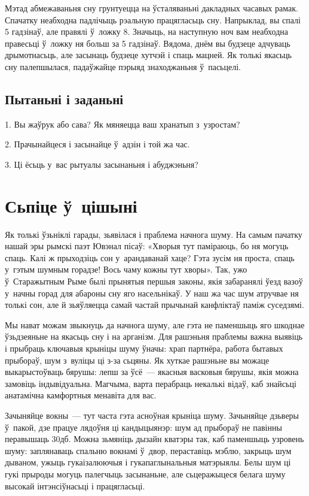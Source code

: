 Мэтад абмежаваньня сну грунтуецца на ўсталяваньні дакладных часавых рамак. Спачатку неабходна падлічыць рэальную працягласьць сну. Напрыклад, вы спалі 5 гадзінаў, але правялі ў~ложку 8. Значыць, на наступную ноч вам неабходна правесьці ў~ложку ня больш за 5 гадзінаў. Вядома, днём вы будзеце адчуваць дрымотнасьць, але засынаць будзеце хутчэй і спаць мацней. Як толькі якасьць сну палепшылася, падаўжайце пэрыяд знаходжаньня ў~пасьцелі.

\subsection*{Пытаньні і заданьні}

1. Вы жаўрук або сава? Як мяняецца ваш хранатып з~узростам?

2. Прачынайцеся і засынайце ў~адзін і той жа час.

3. Ці ёсьць у~вас рытуалы засынаньня і абуджэньня?


\section{Сьпіце ў~цішыні}

Як толькі ўзьніклі гарады, зьявілася і праблема начнога шуму. На самым пачатку нашай эры рымскі паэт Ювэнал пісаў: «Хворыя тут паміраюць, бо ня могуць спаць. Калі ж прыходзіць сон у~арандаванай хаце? Гэта зусім ня проста, спаць у~гэтым шумным горадзе! Вось чаму кожны тут хворы». Так, ужо ў~Старажытным Рыме былі прынятыя першыя законы, якія забаранялі ўезд вазоў у~начны горад для абароны сну яго насельнікаў. У наш жа час шум атручвае ня толькі сон, але й зьяўляецца самай частай прычынай канфліктаў паміж суседзямі.

Мы нават можам звыкнуць да начнога шуму, але гэта не паменшыць яго шкоднае ўзьдзеяньне на якасьць сну і на арганізм. Для рашэньня праблемы важна выявіць і прыбраць ключавыя крыніцы шуму ўначы: храп партнёра, работа бытавых прыбораў, шум з~вуліцы ці з-за сьцяны. Як хуткае рашэньне вы можаце выкарыстоўваць бярушы: лепш за ўсё~--- якасныя васковыя бярушы, якія можна замовіць індывідуальна. Магчыма, варта перабраць некалькі відаў, каб знайсьці анатамічна камфортныя менавіта для вас.

Зачыняйце вокны~--- тут часта гэта асноўная крыніца шуму. Зачыняйце дзьверы ў~пакой, дзе працуе лядоўня ці кандыцыянэр: шум ад прыбораў не павінны перавышаць 30дб. Можна зьмяніць дызайн кватэры так, каб паменшыць узровень шуму: заплянаваць спальню вокнамі ў~двор, пераставіць мэблю, закрыць шум дываном, ужыць гукаізалюючыя і гукапаглынальныя матэрыялы. Белы шум ці гукі прыроды могуць палегчыць засынаньне, але сьцеражыцеся белага шуму высокай інтэнсіўнасьці і працягласьці.

